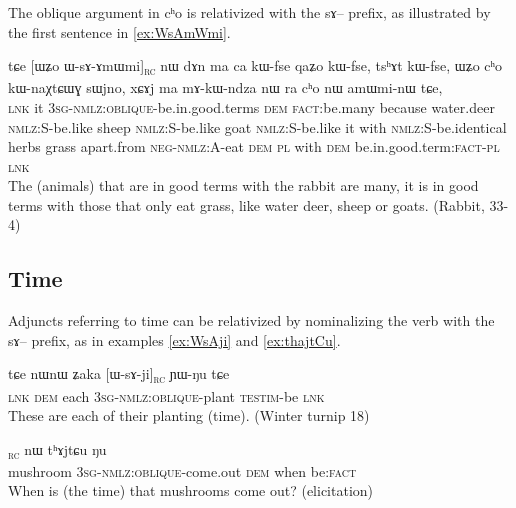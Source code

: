 \documentclass[oldfontcommands,oneside,a4paper,11pt]{article}
\newcommand{\ipa}[1]{{\phon #1}} %
\newcommand{\topic}{\textsc{dem}}
\newcommand{\rc}{\textsubscript{\textsc{rc}}}
\begin{document}
The oblique argument in \ipa{cʰo} is relativized with the \ipa{sɤ}-- prefix, as illustrated by the first sentence in \ref{ex:WsAmWmi}.
\begin{exe}
   \ex \label{ex:WsAmWmi}
 \gll 
\ipa{tɕe}   	[\ipa{ɯʑo}   	\ipa{ɯ-sɤ-ɤmɯmi}]\rc{}   	\ipa{nɯ}   	\ipa{dɤn}   	\ipa{ma}   	\ipa{ca}   	\ipa{kɯ-fse}   	\ipa{qaʑo}   	\ipa{kɯ-fse,}   	\ipa{tsʰɤt}   	\ipa{kɯ-fse,}   	 \ipa{ɯʑo}   	\ipa{cʰo}   	\ipa{kɯ-naχtɕɯɣ}   	\ipa{sɯjno,}   	\ipa{xɕɤj}   	\ipa{ma}   	\ipa{mɤ-kɯ-ndza}   	\ipa{nɯ} \ipa{ra}   	\ipa{cʰo}   	\ipa{nɯ}   	\ipa{amɯmi-nɯ}   	\ipa{tɕe,}   \\
\textsc{lnk} it \textsc{3sg-nmlz:oblique}-be.in.good.terms \topic{} \textsc{fact:}be.many because water.deer \textsc{nmlz:S}-be.like sheep \textsc{nmlz:S}-be.like goat  \textsc{nmlz:S}-be.like it with  \textsc{nmlz:S}-be.identical herbs grass apart.from \textsc{neg-nmlz:A}-eat \textsc{dem} \textsc{pl} with \textsc{dem} be.in.good.term:\textsc{fact}-\textsc{pl} \textsc{lnk} \\
\glt The (animals) that are in good terms with the rabbit are many, it is in good terms with those that only eat grass, like water deer, sheep or goats. (Rabbit, 33-4)
\end{exe}

\subsection{Time} \label{sec:rel:time}

Adjuncts referring to   time can be relativized by nominalizing the verb with the \ipa{sɤ}-- prefix, as in examples \ref{ex:WsAji} and \ref{ex:thajtCu}.

\begin{exe}
   \ex \label{ex:WsAji}
   \ipa{tɕe} 	\ipa{nɯnɯ} 	\ipa{ʑaka} 	[\ipa{ɯ-sɤ-ji}]\rc{} 	\ipa{ɲɯ-ŋu} 	\ipa{tɕe} \\
   \textsc{lnk} \textsc{dem} each \textsc{3sg-nmlz:oblique}-plant \textsc{testim}-be \textsc{lnk} \\
\glt These are each of their planting (time). (Winter turnip 18)
\end{exe}

\begin{exe}
   \ex \label{ex:thajtCu}
 \gll [\ipa{tɤjmɤɣ}   	\ipa{ɯ-sɤɣ-ɬoʁ}]\rc{}   	\ipa{nɯ}   	\ipa{tʰɤjtɕu}   	\ipa{ŋu}   \\
 mushroom \textsc{3sg-nmlz:oblique}-come.out \topic{} when be:\textsc{fact} \\
 \glt When is (the time) that mushrooms come out? (elicitation)
\end{exe}
\end{document}
